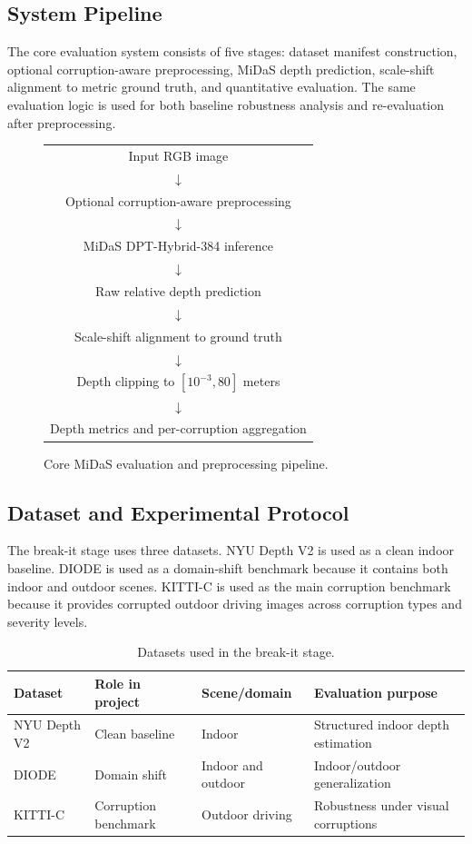 \documentclass[10pt]{article}
\begin{document}
\subsection{System Pipeline}

The core evaluation system consists of five stages: dataset manifest construction, optional corruption-aware preprocessing, MiDaS depth prediction, scale-shift alignment to metric ground truth, and quantitative evaluation. The same evaluation logic is used for both baseline robustness analysis and re-evaluation after preprocessing.

\begin{figure}[H]
\centering
\begin{tabular}{c}
Input RGB image \\
\(\downarrow\) \\
Optional corruption-aware preprocessing \\
\(\downarrow\) \\
MiDaS DPT-Hybrid-384 inference \\
\(\downarrow\) \\
Raw relative depth prediction \\
\(\downarrow\) \\
Scale-shift alignment to ground truth \\
$\downarrow$ \\
Depth clipping to $[10^{-3}, 80]$ meters \\
$\downarrow$ \\
Depth metrics and per-corruption aggregation
\end{tabular}
\caption{Core MiDaS evaluation and preprocessing pipeline.}
\label{fig:pipeline}
\end{figure}

\subsection{Dataset and Experimental Protocol}

The break-it stage uses three datasets. NYU Depth V2 is used as a clean indoor baseline. DIODE is used as a domain-shift benchmark because it contains both indoor and outdoor scenes. KITTI-C is used as the main corruption benchmark because it provides corrupted outdoor driving images across corruption types and severity levels.

\begin{table}[H]
\centering
\begin{tabular}{llll}
\toprule
Dataset & Role in project & Scene/domain & Evaluation purpose \\
\midrule
NYU Depth V2 & Clean baseline & Indoor & Structured indoor depth estimation \\
DIODE & Domain shift & Indoor and outdoor & Indoor/outdoor generalization \\
KITTI-C & Corruption benchmark & Outdoor driving & Robustness under visual corruptions \\
\bottomrule
\end{tabular}
\caption{Datasets used in the break-it stage.}
\label{tab:datasets}
\end{table}
\end{document}
